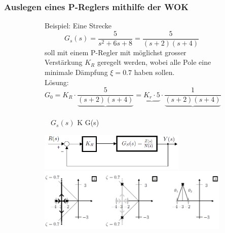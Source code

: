 \subsubsection{Auslegen eines P-Reglers mithilfe der WOK}
\begin{figure}[h!]
	\begin{subfigure}[b]{8.5cm}
Beispiel: Eine Strecke \[G_s(s)=\frac{5}{s^2 + 6s +8}=\frac{5}{(s+2)(s+4)}\] soll mit einem P-Regler mit
 möglichst grosser Verstärkung $K_R$ geregelt werden, wobei alle Pole eine minimale
 Dämpfung $\xi = 0.7$ haben sollen.\\
Lösung: \[G_0=K_R\cdot\frac{5}{\underbrace{(s+2)(s+4)}}=\underbrace{K_r\cdot 5} \cdot\frac{1}{\underbrace{(s+2)(s+4)}}\]
\vspace{-0.5cm}\\
\textcolor{white}{x} \hspace{1.75cm} $G_s(s)$ \hspace{1.45cm} K  \hspace{1.1cm} G(s)\\

	\end{subfigure}\qquad
	\begin{subfigure}[b]{10cm}
		\includegraphics[width=7cm]{./images/PReglerBeispielWOK1.png}
		\includegraphics[width=10cm]{./images/PReglerBeispielWOK2.png}
	\end{subfigure}
\end{figure}

